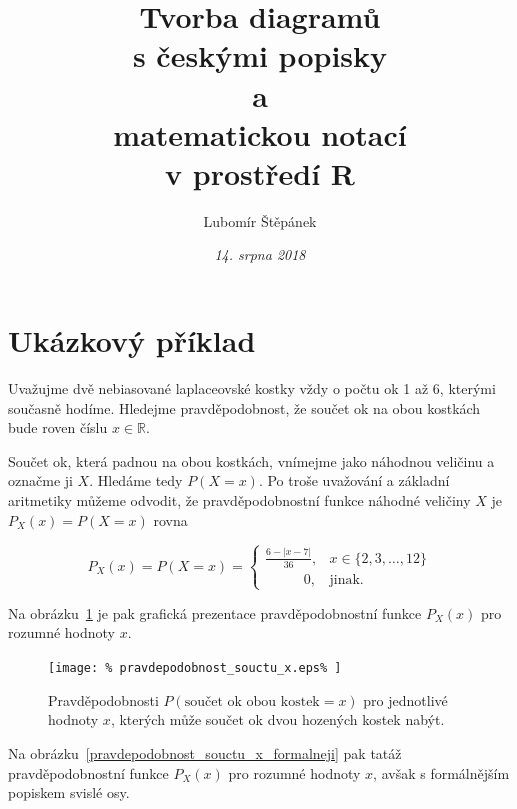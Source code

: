 \documentclass{article}
\title{%
  Tvorba diagramů\\
  s českými popisky\\
  a\\
  matematickou notací\\
  v prostředí \textsf{R}
}
\author{Lubomír Štěpánek}
\date{\textit{14. srpna 2018}}
\begin{document}
\maketitle         %

\tableofcontents   %



\section{Ukázkový příklad}

Uvažujme dvě nebiasované laplaceovské kostky vždy o počtu ok 1 až 6,
kterými současně hodíme. Hledejme pravděpodobnost, že součet ok na obou
kostkách bude roven číslu $x \in \mathbb{R}$.

Součet ok, která padnou na obou kostkách, vnímejme jako náhodnou veličinu
a označme ji $X$. Hledáme tedy $P(X = x)$. Po troše uvažování a základní
aritmetiky můžeme odvodit,
že pravděpodobnostní funkce náhodné veličiny $X$ je $P_{X}(x) = P(X = x)$
rovna

\begin{equation*}
  P_{X}(x) = P(X = x) = \left\{
  \begin{array}{ll}
  \frac{6 - \lvert x - 7 \rvert}{36}, & x \in \{2, 3, \ldots, 12\} \\
  \phantom{iiiiiiii}0, & \text{jinak}.
  \end{array} \right.
\end{equation*}

Na obrázku~\ref{pravdepodobnost_souctu_x} je pak grafická prezentace
pravděpodobnostní funkce $P_{X}(x)$ pro rozumné hodnoty $x$.

\begin{figure}[H]
  \centering
  \texttt{[image: \%
    pravdepodobnost\_souctu\_x.eps\%
  ]}
  \caption{%
    Pravděpodobnosti $P(\textrm{součet ok obou kostek} = x)$ pro
    jednotlivé hodnoty $x$, kterých může součet
    ok dvou hozených kostek nabýt.
    \label{pravdepodobnost_souctu_x}%
  }
\end{figure}

Na obrázku~\ref{pravdepodobnost_souctu_x_formalneji} pak tatáž
pravděpodobnostní funkce $P_{X}(x)$ pro rozumné hodnoty $x$, avšak
s formálnějším popiskem svislé osy.
\end{document}
